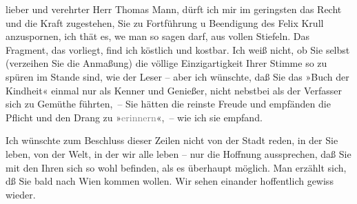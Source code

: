\pstart{}lieber und verehrter Herr Thomas Mann,\pend\vspace{0.5em}
\pstart
           dürft ich mir im geringsten das Recht und die Kraft zugestehen, Sie zu Fortführung u
               Beendigung des Felix Krull anzuspornen, ich thät
               es, we{\geminationn} man so sagen darf, aus vollen Stiefeln. Das Fragment, das vorliegt, find
               ich köstlich und kostbar. Ich weiß nicht, ob Sie selbst (verzeihen Sie die Anmaßung)
               die völlige Einzigartigkeit Ihrer Stimme so zu spüren im Stande sind, wie der Leser –
               aber ich wünschte, daß Sie das »Buch der Kindheit« einmal nur als Kenner und
               Genießer, nicht nebstbei als der Verfasser sich zu Gemüthe führten, – Sie hätten die
               reinste Freude und empfänden die Pflicht und den Drang zu
                  »\textcolor{gray}{erinnern}«, – wie ich sie empfand.\pend
           
\pstart
           Ich wünschte zum Beschluss dieser Zeilen {\pb}nicht von der Stadt reden,
               in der Sie leben, von der Welt, in der wir alle leben – nur die Hoffnung aussprechen,
               daß Sie mit den Ihren sich so wohl befinden, als es überhaupt möglich. Man erzählt
               sich, dß Sie bald nach Wien kommen wollen. Wir
               sehen einander hoffentlich gewiss wieder.\pend
           
